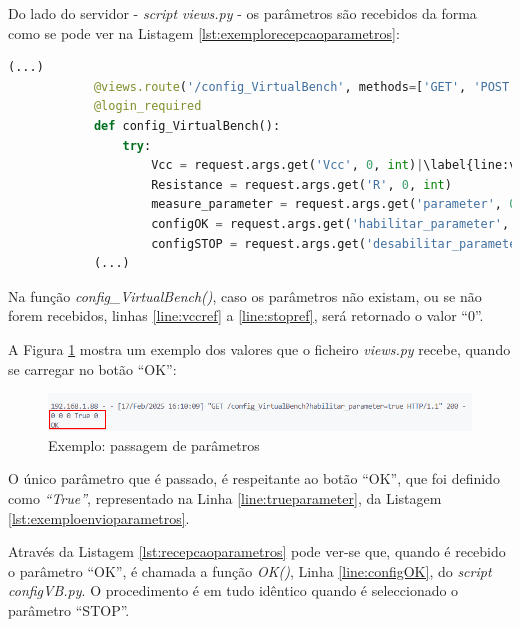 Do lado do servidor - \textit{script views.py} - os parâmetros são recebidos da forma como se pode ver na Listagem \ref{lst:exemplorecepcaoparametros}:
\begin{center}
	\begin{minipage}{1\linewidth}
		\begin{lstlisting}[language=Python,escapechar=|, caption=Recepção dos parâmetros no \textit{script views.py} enviados da página \textit{ohm.html}, label=lst:exemplorecepcaoparametros]
			(...)
			@views.route('/config_VirtualBench', methods=['GET', 'POST'])
			@login_required
			def config_VirtualBench():
				try:
					Vcc = request.args.get('Vcc', 0, int)|\label{line:vccref}|
					Resistance = request.args.get('R', 0, int)
					measure_parameter = request.args.get('parameter', 0, str)|\label{line:measureref}|
					configOK = request.args.get('habilitar_parameter', 0, bool)
					configSTOP = request.args.get('desabilitar_parameter', 0, bool)|\label{line:stopref}|
			(...)
		\end{lstlisting}
	\end{minipage}
\end{center}

Na função \textit{config\_VirtualBench()}, caso os parâmetros não existam, ou se não forem recebidos, linhas \ref{line:vccref} a \ref{line:stopref}, será retornado o valor ``0''.

A Figura \ref{fig:passagemparametros} mostra um exemplo dos valores que o ficheiro \textit{views.py} recebe, quando se carregar no botão ``OK'':
\begin{figure}[hbtp]
	\centering
	\includegraphics[width=1\textwidth]{figures/exemplo_dados_Ohm.png}
	\caption{Exemplo: passagem de parâmetros}
	\label{fig:passagemparametros}
\end{figure}

O único parâmetro que é passado, é respeitante ao botão ``OK'', que foi definido como \textit{``True''}, representado na Linha \ref{line:trueparameter}, da Listagem \ref{lst:exemploenvioparametros}.

Através da Listagem \ref{lst:recepcaoparametros} pode ver-se que, quando é recebido o parâmetro ``OK'', é chamada a função \textit{OK()}, Linha \ref{line:configOK}, do \textit{script} \textit{configVB.py}. O procedimento é em tudo idêntico quando é seleccionado o parâmetro ``STOP''.

